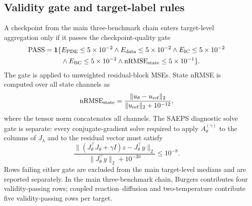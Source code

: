 \documentclass[preprint,12pt]{elsarticle}
\begin{document}
\subsection{Validity gate and target-label rules}

A checkpoint from the main three-benchmark chain enters target-level aggregation only if it passes the checkpoint-quality gate
\begin{equation}
\begin{aligned}
\mathrm{PASS}=\mathbf{1}\{&E_{\rm PDE}\le 5\times10^{-2}
\land E_{\rm data}\le 5\times10^{-2}
\land E_{\rm IC}\le 5\times10^{-2}\\
&\land E_{\rm BC}\le 5\times10^{-2}
\land \mathrm{nRMSE}_{\rm state}\le 5\times10^{-1}\}.
\end{aligned}
\label{eq:checkpoint_gate}
\end{equation}
The gate is applied to unweighted residual-block MSEs.  State nRMSE is computed over all state channels as
\begin{equation}
    \mathrm{nRMSE}_{\rm state}
    =
    \frac{\|u_\theta-u_{\rm ref}\|_2}{\|u_{\rm ref}\|_2+10^{-12}},
\end{equation}
where the tensor norm concatenates all channels.  The SAEPS diagnostic solve gate is separate: every conjugate-gradient solve required to apply $A_\theta^{(\gamma)}$ to the columns of $J_\lambda$ and to the residual vector must satisfy
\begin{equation}
    \frac{\|(J_\theta^\top J_\theta+\gamma I)z-J_\theta^\top y\|_2}
    {\|J_\theta^\top y\|_2+10^{-30}}
    \le 10^{-8}.
    \label{eq:cg_gate}
\end{equation}
Rows failing either gate are excluded from the main target-level medians and are reported separately.  In the main three-benchmark chain, Burgers contributes four validity-passing rows; coupled reaction--diffusion and two-temperature contribute five validity-passing rows per target.
\end{document}
